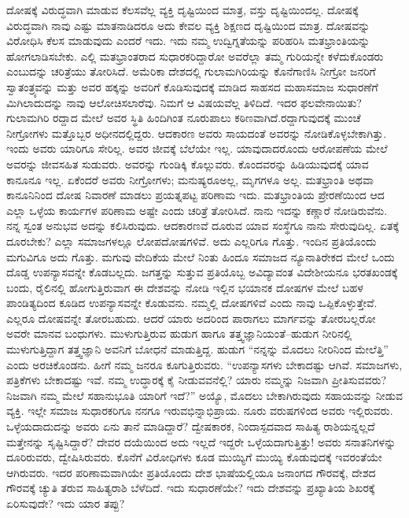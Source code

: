 ದೋಷಕ್ಕೆ ವಿರುದ್ಧವಾಗಿ ಮಾಡುವ ಕೆಲಸವೆಲ್ಲ ವ್ಯಕ್ತಿ ದೃಷ್ಟಿಯಿಂದ ಮಾತ್ರ, ವಸ್ತು ದೃಷ್ಟಿಯಿಂದಲ್ಲ. ದೋಷಕ್ಕೆ ವಿರುದ್ಧವಾಗಿ ನಾವು ಎಷ್ಟು ಮಾತನಾಡಿದರೂ ಅದು ಕೇವಲ ವ್ಯಕ್ತಿ ಶಿಕ್ಷಣದ ದೃಷ್ಟಿಯಿಂದ ಮಾತ್ರ. ದೋಷವನ್ನು ವಿರೋಧಿಸಿ ಕೆಲಸ ಮಾಡುವುದು ಎಂದರೆ ಇದು. ಇದು ನಮ್ಮ ಉದ್ವಿಗ್ನತೆಯನ್ನು ಪರಿಹರಿಸಿ ಮತಭ್ರಾಂತಿಯನ್ನು ಹೋಗಲಾಡಿಸಬೇಕು. ಎಲ್ಲಿ ಮತಭ್ರಾಂತರಾದ ಸುಧಾರಕರಿದ್ದಾರೋ ಅವರೆಲ್ಲಾ ತಮ್ಮ ಗುರಿಯನ್ನೇ ಕಳೆದು\-ಕೊಂಡರು ಎಂಬುದನ್ನು ಚರಿತ್ರೆಯು ತೋರಿಸಿದೆ. ಅಮೆರಿಕಾ ದೇಶದಲ್ಲಿ ಗುಲಾಮಗಿರಿಯನ್ನು ಕೊನೆಗಾಣಿಸಿ ನೀಗ್ರೋ ಜನರಿಗೆ ಸ್ವಾತಂತ್ರ್ಯವನ್ನು ಮತ್ತು ಅವರ ಹಕ್ಕನ್ನು ಅವರಿಗೆ ಕೊಡಿಸುವುದಕ್ಕೆ ಮಾಡಿದ ಸಾಹಸದ ಮಹಾಸಮಾಜ ಸುಧಾರಣೆಗೆ ಮಿಗಿಲಾದುದನ್ನು ನಾವು ಆಲೋಚಿಸಲಾರೆವು. ನಿಮಗೆ ಆ ವಿಷಯವೆಲ್ಲ ತಿಳಿದಿದೆ. ಇದರ ಫಲವೇನಾಯಿತು? ಗುಲಾಮಗಿರಿ ರದ್ದಾದ ಮೇಲೆ ಅವರ ಸ್ಥಿತಿ ಹಿಂದಿಗಿಂತ ನೂರುಪಾಲು ಕಠಿಣವಾಗಿದೆ.\break ರದ್ದಾಗುವುದಕ್ಕೆ ಮುಂಚೆ ನೀಗ್ರೋಗಳು ಮತ್ತೊಬ್ಬರ ಅಧೀನದಲ್ಲಿದ್ದರು. ಆದಕಾರಣ ಅವರು ಸಾಯದಂತೆ ಅವರನ್ನು ನೋಡಿಕೊಳ್ಳಬೇಕಾಗಿತ್ತು. ಇಂದು ಅವರು ಯಾರಿಗೂ ಸೇರಿಲ್ಲ. ಅವರ ಜೀವಕ್ಕೆ ಬೆಲೆಯೇ ಇಲ್ಲ. ಯಾವುದಾದರೊಂದು ಆರೋಪಣೆಯ ಮೇಲೆ ಅವರನ್ನು ಜೀವಸಹಿತ ಸುಡುವರು. ಅವರನ್ನು ಗುಂಡಿಕ್ಕಿ ಕೊಲ್ಲುವರು. ಕೊಂದವರನ್ನು ಹಿಡಿಯು\-ವುದಕ್ಕೆ ಯಾವ ಕಾನೂನೂ ಇಲ್ಲ. ಏಕೆಂದರೆ ಅವರು ನೀಗ್ರೋಗಳು; ಮನುಷ್ಯರೂ\break ಅಲ್ಲ, ಮೃಗಗಳೂ ಅಲ್ಲ. ಮತಭ್ರಾಂತಿ ಅಥವಾ ಕಾನೂನಿನಿಂದ ದೋಷ ನಿವಾರಣೆ ಮಾಡಲು ಪ್ರಯತ್ನಪಟ್ಟ ಪರಿಣಾಮ ಇದು. ಮತಭ್ರಾಂತಿಯ ಪ್ರೇರಣೆಯಿಂದ ಆದ ಎಲ್ಲಾ ಒಳ್ಳೆಯ ಕಾರ್ಯಗಳ ಪರಿಣಾಮ ಅಷ್ಟೇ ಎಂದು ಚರಿತ್ರೆ ತೋರಿಸಿದೆ. ನಾನು ಇದನ್ನು ಕಣ್ಣಾರೆ ನೋಡಿರುವೆನು. ನನ್ನ ಸ್ವಂತ ಅನುಭವ ಅದನ್ನು ಕಲಿಸಿರುವುದು. ಆದಕಾರಣವೆ ದೂರುವ ಯಾವ ಸಂಸ್ಥೆಗೂ ನಾನು ಸೇರುವುದಿಲ್ಲ. ಏತಕ್ಕೆ ದೂರಬೇಕು? ಎಲ್ಲಾ ಸಮಾಜಗಳಲ್ಲೂ ಲೋಪದೋಷಗಳಿವೆ. ಅದು ಎಲ್ಲರಿಗೂ ಗೊತ್ತು. ಇಂದಿನ ಪ್ರತಿಯೊಂದು ಮಗುವಿಗೂ ಅದು ಗೊತ್ತು. ಮಗುವು ವೇದಿಕೆಯ ಮೇಲೆ ನಿಂತು ಹಿಂದೂ ಸಮಾಜದ ನ್ಯೂನಾತಿರೇಕದ ಮೇಲೆ ಒಂದು ದೊಡ್ಡ ಉಪನ್ಯಾಸವನ್ನೇ ಕೊಡಬಲ್ಲದು. ಜಗತ್ತನ್ನು ಸುತ್ತುವ ಪ್ರತಿಯೊಬ್ಬ ಅವಿದ್ಯಾವಂತ ವಿದೇಶೀಯನೂ ಭರತಖಂಡಕ್ಕೆ ಬಂದು, ರೈಲಿನಲ್ಲಿ ಹೋಗುತ್ತಿರುವಾಗ ಈ ದೇಶವನ್ನು ನೋಡಿ ಇಲ್ಲಿನ ಭಯಾನಕ ದೋಷಗಳ ಮೇಲೆ ಬಹಳ ಪಾಂಡಿತ್ಯದಿಂದ ಕೂಡಿದ ಉಪನ್ಯಾಸವನ್ನೇ ಕೊಡುವನು. ನಮ್ಮಲ್ಲಿ ದೋಷಗಳಿವೆ ಎಂದು ನಾವು ಒಪ್ಪಿಕೊಳ್ಳುತ್ತೇವೆ. ಎಲ್ಲರೂ ದೋಷವನ್ನೇ ತೋರಬಹುದು. ಆದರೆ ಯಾರು ಅದರಿಂದ ಪಾರಾಗಲು ಮಾರ್ಗವನ್ನು ತೋರಬಲ್ಲರೋ ಅವರೇ ಮಾನವ ಬಂಧುಗಳು. ಮುಳುಗುತ್ತಿರುವ ಹುಡುಗ ಹಾಗೂ ತತ್ತ್ವಜ್ಞಾನಿಯಂತೆ–ಹುಡುಗ ನೀರಿನಲ್ಲಿ ಮುಳುಗುತ್ತಿದ್ದಾಗ ತತ್ತ್ವಜ್ಞಾನಿ ಅವನಿಗೆ ಬೋಧನೆ ಮಾಡುತ್ತಿದ್ದ. ಹುಡುಗ “ನನ್ನನ್ನು ಮೊದಲು ನೀರಿನಿಂದ ಮೇಲೆತ್ತಿ” ಎಂದು ಅರಚಿಕೊಂಡನು. ಹೀಗೆ ನಮ್ಮ ಜನರೂ ಕೂಗುತ್ತಿರುವರು. “ಉಪನ್ಯಾಸಗಳು ಬೇಕಾದಷ್ಟು ಆಗಿವೆ. ಸಮಾಜಗಳು, ಪತ್ರಿಕೆಗಳು ಬೇಕಾದಷ್ಟು ಇವೆ. ನಮ್ಮ ಉದ್ಧಾರಕ್ಕೆ ಕೈ ನೀಡುವವನೆಲ್ಲಿ? ಯಾರು ನಮ್ಮನ್ನು ನಿಜವಾಗಿ ಪ್ರೀತಿಸುವವರು? ನಿಜವಾಗಿ ನಮ್ಮ ಮೇಲೆ ಸಹಾನುಭೂತಿ ಯಾರಿಗೆ ಇದೆ?” ಅಯ್ಯೊ, ಮೊದಲು ಬೇಕಾಗಿರುವುದು ಸಹಾಯವನ್ನು ನೀಡುವ ವ್ಯಕ್ತಿ. ಇಲ್ಲೇ ಸಮಾಜ ಸುಧಾರಕರಿಗೂ ನನಗೂ ಇರುವ\break ಭಿನ್ನಾಭಿಪ್ರಾಯ. ನೂರು ವರುಷಗಳಿಂದ ಅವರು ಇಲ್ಲಿರುವರು. ಒಳ್ಳೆಯದಾದುದನ್ನು ಅವರು ಏನು ತಾನೆ ಮಾಡಿದ್ದಾರೆ? ದ್ವೇಷಕಾರಕ, ನಿಂದಾಸ್ಪದವಾದ ಸಾಹಿತ್ಯ ರಾಶಿಯನ್ನಲ್ಲದೆ ಮತ್ತೇನನ್ನು ಸೃಷ್ಟಿಸಿದ್ದಾರೆ? ದೇವರ ದಯೆಯಿಂದ ಅದು ಇಲ್ಲದೆ ಇದ್ದರೇ ಒಳ್ಳೆಯದಾಗುತ್ತಿತ್ತು! ಅವರು ಸನಾತನಿಗಳನ್ನು ದೂರಿರುವರು, ದ್ವೇಷಿಸಿರುವರು. ಕೊನೆಗೆ ವಿರೋಧಿ\-ಗಳು ಕೂಡ ಮುಯ್ಯಿಗೆ ಮುಯ್ಯಿ ಕೊಡುವುದಕ್ಕೆ ಇವರಂತೆಯೇ ಆಗಿರುವರು. ಇದರ ಪರಿಣಾಮವಾಗಿಯೇ ಪ್ರತಿಯೊಂದು ದೇಶ ಭಾಷೆಯಲ್ಲಿಯೂ ಜನಾಂಗದ ಗೌರವಕ್ಕೆ, ದೇಶದ ಗೌರವಕ್ಕೆ ಚ್ಯುತಿ ತರುವ ಸಾಹಿತ್ಯರಾಶಿ ಬೆಳೆದಿದೆ. ಇದು ಸುಧಾರಣೆಯೇ? ಇದು ದೇಶವನ್ನು ಪ್ರಖ್ಯಾತಿಯ ಶಿಖರಕ್ಕೆ ಏರಿಸುವುದೇ? ಇದು ಯಾರ ತಪ್ಪು?

